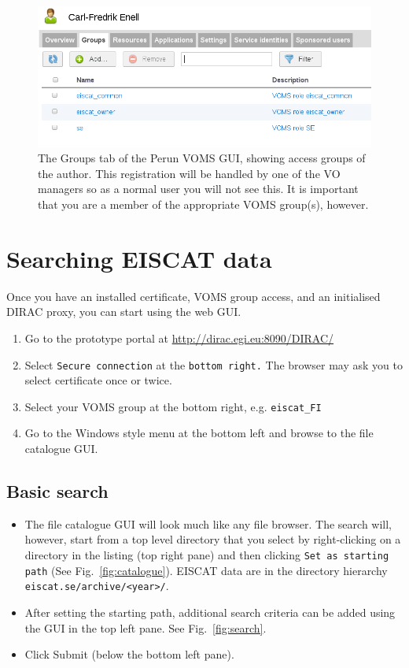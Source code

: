 \documentclass[a4paper]{article}
\begin{document}
\begin{figure}[htb]
  \centering
  \includegraphics[width=1.0\linewidth]{voms-groups-perun}
  \caption{The Groups tab of the Perun VOMS GUI, showing access groups of the author. This registration will be handled by one of the VO managers so as a normal user you will not see this. It is important that you are a member of the appropriate VOMS group(s), however.}
  \label{fig:perun}
\end{figure}


\section{Searching EISCAT data}
\label{sec:searching}

Once you have an installed certificate, VOMS group access, and an initialised DIRAC proxy, you can start using the web GUI.

\begin{enumerate}
\item Go to the prototype portal at \url{http://dirac.egi.eu:8090/DIRAC/}
\item Select \texttt{Secure connection} at the \texttt{bottom right.} The browser may ask you to select certificate once or twice.
\item Select your VOMS group at the bottom right, e.g. \texttt{eiscat\_FI}
\item Go to the Windows style menu at the bottom left and browse to the file catalogue GUI. 
\end{enumerate}

\subsection{Basic search}
\label{sec:searchdir}


\begin{itemize}
\item  The file catalogue GUI will look much like any file browser. The search will, however, start from a top level directory that you select by right-clicking on a directory in the listing (top right pane) and then clicking \texttt{Set as starting path} (See Fig.~\ref{fig:catalogue}). EISCAT data are in the directory hierarchy \texttt{eiscat.se/archive/<year>/}.
\item After setting the starting path, additional search criteria can be added using the GUI in the top left pane. See Fig.~\ref{fig:search}. 
\item Click Submit (below the bottom left pane). 
\end{itemize}
\end{document}
